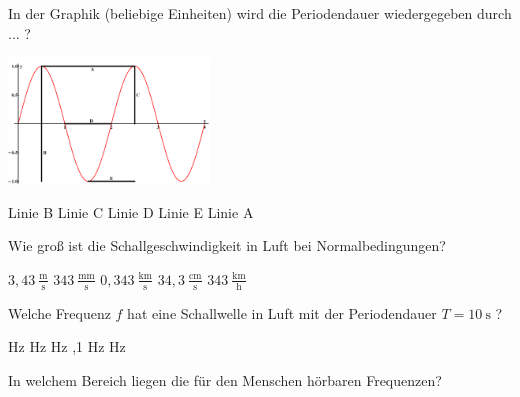 \documentclass[11pt]{exam}
\begin{document}
\setlength{\voffset}{-0.5in}
\setlength{\headsep}{5pt}

\hspace{2mm}
 \hspace{5mm}
\vspace{4mm}

\begin{questions}

\question In der Graphik (beliebige Einheiten) wird die Periodendauer wiedergegeben durch ... ? 

\includegraphics[width=0.4\textwidth]{images/Sinuskurve.png}

\begin{choices}
	\choice Linie B
	\choice Linie C
	\choice Linie D
	\choice Linie E
	\choice Linie A
\end{choices}

\vspace{3mm}\question Wie groß ist die Schallgeschwindigkeit in Luft bei Normalbedingungen?

\begin{choices}
	\choice \( \mathrm{3,43~\frac{m}{s}} \)
	\choice \( \mathrm{343~\frac{mm}{s}} \)
	\choice \( \mathrm{0,343~\frac{km}{s}} \)
	\choice \( \mathrm{34,3~\frac{cm}{s}} \)
	\choice \( \mathrm{343~\frac{km}{h}} \)
\end{choices}

\vspace{3mm}\question Welche Frequenz \( f \) hat eine Schallwelle in Luft mit der Periodendauer \( T= \mathrm{10~s} \) ?

\begin{choices}
	 Hz
	 Hz
	 Hz
	,1 Hz
	 Hz
\end{choices}

\vspace{3mm}\question In welchem Bereich liegen die für den Menschen hörbaren Frequenzen?


\end{questions}
\end{document}
